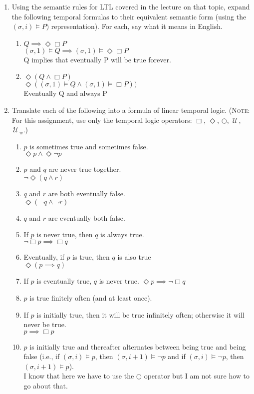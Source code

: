 \documentclass{article}
\newcommand{\Until}{\,\mathcal{U}\,}
\newcommand{\Next}{\bigcirc}
\begin{document}
\begin{enumerate}
\item Using the semantic rules for LTL covered in the lecture on that topic, expand the following temporal formulas to their equivalent semantic form (using the $(\sigma,i)\models P)$  representation). For each, say what it means in English.
\begin{enumerate}
\item $Q \implies \Diamond \Box P$ \\
  $(\sigma,1)\models Q \implies (\sigma,1)\models \Diamond \Box P$ \\
  Q implies that eventually P will be true forever. \\
\item $\Diamond (Q \land \Box P)$ \\
  $\Diamond ((\sigma,1)\models Q \land (\sigma,1)\models  \Box P))$ \\
  Eventually Q and always P \\
\end{enumerate}
\item Translate each of the following into a formula of linear temporal logic. (\textsc{Note}: For this assignment, use only the temporal logic operators: $\Box$, $\Diamond$, $\Next$, $\Until$, $\Until_w$.)
\begin{enumerate}
\item $p$ is sometimes true and sometimes false. \\
$ \Diamond p \land \Diamond \neg p $
\item $p$ and $q$ are never true together. \\
$ \neg \Diamond ( q \land r) $
\item $q$ and $r$ are both eventually false. \\
$ \Diamond ( \neg q \land \neg r) $  
\item $q$ and $r$ are eventually both false.
\item If $p$ is never true, then $q$ is always true. \\
  $\neg \Box p \implies \Box q $ 
\item Eventually, if $p$ is true, then $q$ is also true \\
  $ \Diamond (p \implies q) $
\item If $p$ is eventually true, $q$ is never true.
  $ \Diamond p \implies \neg \Box q $
\item $p$ is true finitely often (and at least once).
\item If $p$ is initially true, then it will be true infinitely often; otherwise it will never be true. \\
  $p \implies \Box p$ 
\item $p$ is initially true and thereafter alternates between being true and being false (i.e., if $(\sigma,i)\models p$, then $(\sigma,i+1)\models \neg p$ and if $(\sigma,i)\models \neg p$, then $(\sigma,i+1)\models p$). \\
  I know that here we have to use the $\Next$ operator but I am not sure how to go about that.
  
\end{enumerate}

\end{enumerate}
\end{document}
